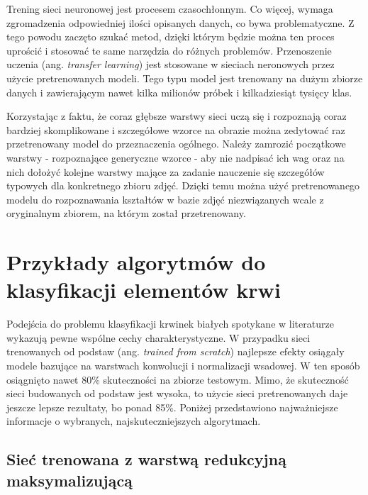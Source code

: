 Trening sieci neuronowej jest procesem czasochłonnym. Co więcej, wymaga zgromadzenia odpowiedniej ilości opisanych danych, co bywa problematyczne. Z tego powodu zaczęto szukać metod, dzięki którym będzie można ten proces uprościć i stosować te same narzędzia do różnych problemów. Przenoszenie uczenia (ang. \textit{transfer learning}) jest stosowane w sieciach neronowych przez użycie pretrenowanych modeli. Tego typu model jest trenowany na dużym zbiorze danych i zawierającym nawet kilka milionów próbek i kilkadziesiąt tysięcy klas. 

{\parindent0pt %
Korzystając z faktu, że coraz głębsze warstwy sieci uczą się i rozpoznają coraz bardziej skomplikowane i szczegółowe wzorce na obrazie można zedytować raz przetrenowany model do przeznaczenia ogólnego. Należy zamrozić początkowe warstwy - rozpoznające generyczne wzorce - aby nie nadpisać ich wag oraz na nich dołożyć kolejne warstwy mające za zadanie nauczenie się szczegółów typowych dla konkretnego zbioru zdjęć. Dzięki temu można użyć pretrenowanego modelu do rozpoznawania kształtów w bazie zdjęć niezwiązanych wcale z oryginalnym zbiorem, na którym został przetrenowany. 
}

\section{Przykłady algorytmów do klasyfikacji elementów krwi}

Podejścia do problemu klasyfikacji krwinek białych spotykane w literaturze wykazują pewne wspólne cechy charakterystyczne. W przypadku sieci trenowanych od podstaw (ang. \textit{trained from scratch}) najlepsze efekty osiągały modele bazujące na warstwach konwolucji i normalizacji wsadowej. W ten sposób osiągnięto nawet 80\% skuteczności na zbiorze testowym. Mimo, że skuteczność sieci budowanych od podstaw jest wysoka, to użycie sieci pretrenowanych daje jeszcze lepsze rezultaty, bo ponad 85\%. Poniżej przedstawiono najważniejsze informacje o wybranych, najskuteczniejszych algorytmach.

\subsection{Sieć trenowana z warstwą redukcyjną maksymalizującą}
\label{section_kaggle_1}

